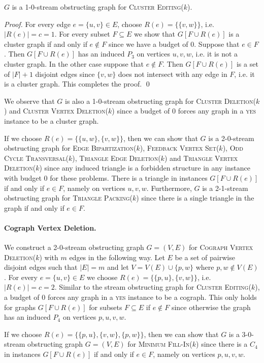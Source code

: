 \documentclass[draft,a4paper]{llncs}
\newcommand{\yes}{\textsc{yes}\xspace}
\newcommand{\CEk}{\textsc{Cluster Editing($k$)}\xspace}
\newcommand{\MFIk}{\textsc{Minimum Fill-In($k$)}\xspace}
\newcommand{\FBVSk}{\textsc{Feedback Vertex Set($k$)}\xspace}
\newcommand{\OCTk}{\textsc{Odd Cycle Transversal($k$)}\xspace}
\newcommand{\CVDk}{\textsc{Cluster Vertex Deletion($k$)}\xspace}
\newcommand{\CEDk}{\textsc{Cluster Deletion($k$)}\xspace}
\newcommand{\BERk}{\textsc{Edge Bipartization($k$)}\xspace}
\newcommand{\CoVDk}{\textsc{Cograph Vertex Deletion($k$)}\xspace}
\newcommand{\TEDk}{\textsc{Triangle Edge Deletion($k$)}\xspace}
\newcommand{\TVDk}{\textsc{Triangle Vertex Deletion($k$)}\xspace}
\newcommand{\TPk}{\textsc{Triangle Packing($k$)}\xspace}
\begin{document}
\begin{lemma}
$G$ is a 1-0-stream obstructing graph for \CEk. 
\end{lemma}

\begin{proof}
For every edge $e = \{u, v\} \in E$, choose $R(e) = \{\{v, w\}\}$, i.e. $|R(e)| = c = 1$. For every subset $F \subseteq E$ we show that $G[F \cup R(e)]$ is a cluster graph if and only if $e \notin F$ since we have a budget of 0. Suppose that $e \in F$. Then $G[F \cup R(e)]$ has an induced $P_3$ on vertices $u, v, w$, i.e. it is not a cluster graph. In the other case suppose that $e \notin F$. Then $G[F \cup R(e)]$ is a set of $|F|+1$ disjoint edges since $\{v, w\}$ does not intersect with any edge in $F$, i.e. it is a cluster graph. This completes the proof. \qed
\end{proof}

We observe that $G$ is also a 1-0-stream obstructing graph for \CEDk and \CVDk since a budget of 0 forces any graph in a \yes instance to be a cluster graph.

If we choose $R(e) = \{\{u, w\}, \{v, w\}\}$, then we can show that $G$ is a 2-0-stream obstructing graph for \BERk, \FBVSk, \OCTk, \TEDk and \TVDk since any induced triangle is a forbidden structure in any instance with budget 0 for these problems. There is a triangle in instances $G[F\cup R(e)]$ if and only if $e \in F$, namely on vertices $u, v, w$. Furthermore, $G$ is a 2-1-stream obstructing graph for \TPk since there is a single triangle in the graph if and only if $e \in F$.

\paragraph{Cograph Vertex Deletion.} We construct a 2-0-stream obstructing graph $G = (V,E)$ for \CoVDk with $m$ edges in the following way. Let $E$ be a set of pairwise disjoint edges such that $|E| = m$ and let $V = V(E) \cup \{p, w\}$ where $p, w \notin V(E)$. For every $e = \{u, v\} \in E$ we choose $R(e) = \{\{p, u\},\{v,w\}\}$, i.e. $|R(e)| = c = 2$. Similar to the stream obstructing graph for \CEk, a budget of 0 forces any graph in a \yes instance to be a cograph. This only holds for graphs $G[F \cup R(e)]$ for subsets $F \subseteq E$ if $e \notin F$ since otherwise the graph has an induced $P_4$ on vertices $p, u, v, w$.

If we choose $R(e) = \{\{p, u\}, \{v, w\}, \{p, w\}\}$, then we can show that $G$ is a 3-0-stream obstructing graph $G = (V, E)$ for \MFIk since there is a $C_4$ in instances $G[F \cup R(e)]$ if and only if $e \in F$, namely on vertices $p, u, v, w$.
\end{document}
